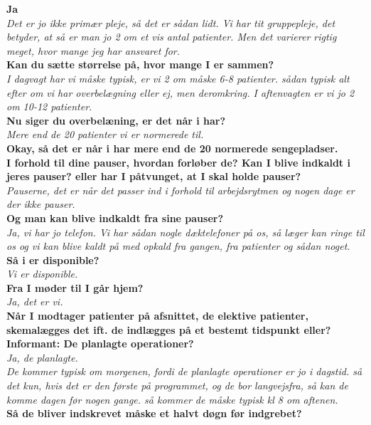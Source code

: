 \noindent
\textbf{Ja} \\
\noindent
\textit{Det er jo ikke primær pleje, så det er sådan lidt. Vi har tit gruppepleje, det betyder, at så er man jo 2 om et vis antal patienter. Men det varierer rigtig meget, hvor mange jeg har ansvaret for.} \\
\noindent
\textbf{Kan du sætte størrelse på, hvor mange I er sammen?} \\
\noindent
\textit{I dagvagt har vi måske typisk, er vi 2 om måske 6-8 patienter. sådan typisk alt efter om vi har overbelægning eller ej, men deromkring. I aftenvagten er vi jo 2 om 10-12 patienter.
} \\
\noindent
\textbf{Nu siger du overbelæning, er det når i har?} \\
\noindent
\textit{Mere end de 20 patienter vi er normerede til.} \\
\noindent
\textbf{Okay, så det er når i har mere end de 20 normerede sengepladser. } \\
\noindent
\textbf{I forhold til dine pauser, hvordan forløber de? Kan I blive indkaldt i jeres pauser? eller har I påtvunget, at I skal holde pauser?} \\
\noindent
\textit{Pauserne, det er når det passer ind i forhold til arbejdsrytmen og nogen dage er der ikke pauser.} \\
\noindent
\textbf{Og man kan blive indkaldt fra sine pauser?} \\
\noindent
\textit{Ja, vi har jo telefon. Vi har sådan nogle dæktelefoner på os, så læger kan ringe til os og vi kan blive kaldt på med opkald fra gangen, fra patienter og sådan noget.}
\textbf{Så i er disponible?} \\
\noindent
\textit{Vi er disponible.} \\
\noindent
\textbf{Fra I møder til I går hjem?} \\
\noindent
\textit{Ja, det er vi.}  \\
\noindent
\textbf{Når I modtager patienter på afsnittet, de elektive patienter, skemalægges det ift. de indlægges på et bestemt tidspunkt eller?
Informant: De planlagte operationer?} \\
\noindent
\textit{Ja, de planlagte.} \\
\noindent
\textit{De kommer typisk om morgenen, fordi de planlagte operationer er jo i dagstid. så det kun, hvis det er den første på programmet, og de bor langvejsfra, så kan de komme dagen før nogen gange. så kommer de måske typisk kl 8 om aftenen.} \\
\noindent
\textbf{Så de bliver indskrevet måske et halvt døgn før indgrebet?} \\
